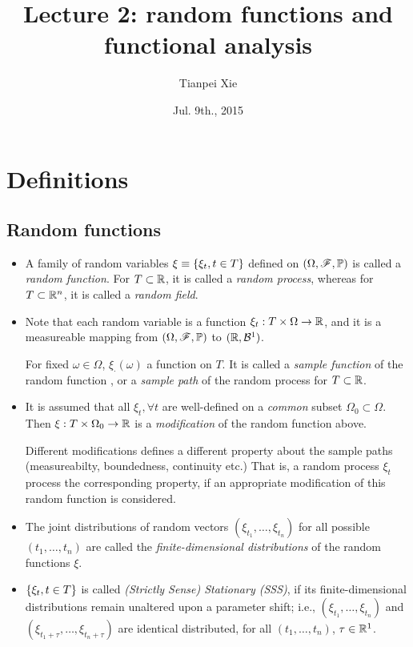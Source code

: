 \documentclass[11pt]{article}
\begin{document}
\title{Lecture 2: random functions and functional analysis}
\author{ Tianpei Xie}
\date{ Jul. 9th., 2015 }
\maketitle
\tableofcontents
\newpage
\section{Definitions}
\subsection{Random functions}
\begin{itemize}
\item A family of random variables $\xi \equiv \left\{\xi_{t}, t\in T\right\}$ defined on $(\Omega, {\mathscr F}, {\mathbb P})$ is called a \emph{random function}. For $T\subset {\mathbb R}$, it is called a \emph{random process}, whereas for $T\subset {\mathbb R}^{n}$, it is called a \emph{random field}.  

\item Note that each random variable is a function $\xi_{t}: T\times \Omega \rightarrow {\mathbb R}$, and it is a measureable mapping from $(\Omega, {\mathscr F}, {\mathbb P})$ to $({\mathbb R}, {\mathcal B}^{1})$. 

For fixed $\omega \in \Omega$,  $\xi_{\cdot}(\omega)$ a function on $T$. It is called  a \emph{sample function} of the random function \citep{lifshits2013gaussian}, or a \emph{sample path} of the random process for $T\subset {\mathbb R}$.

\item It is assumed that all $\xi_{t}, \forall t$ are well-defined on a \emph{common} subset $\Omega_{0}\subset \Omega$. Then $\xi: T\times \Omega_{0} \rightarrow {\mathbb R}$ is a \emph{modification} of the random function above. 

Different modifications defines a different property about the sample paths (measureabilty, boundedness, continuity etc.) That is, a random process $\xi_{t}$ process the corresponding property, if an appropriate modification of this random function is considered.  \\[3pt]

\item The joint distributions of random vectors $(\xi_{t_{1}},\ldots, \xi_{t_{n}}  )$ for all possible $(t_{1},\ldots, t_{n})$ are called the \emph{finite-dimensional distributions} of the random functions $\xi$.

\item $\left\{\xi_{t}, t\in T\right\}$ is called \emph{(Strictly Sense) Stationary (SSS)}, if its finite-dimensional distributions remain unaltered upon a parameter shift; i.e., $(\xi_{t_{1}},\ldots, \xi_{t_{n}}  )$ and $(\xi_{t_{1}+\tau},\ldots, \xi_{t_{n}+\tau}  )$ are identical distributed, for all $(t_{1},\ldots, t_{n})$, $\tau\in {\mathbb R}^{1}$.


\end{itemize}
\end{document}
